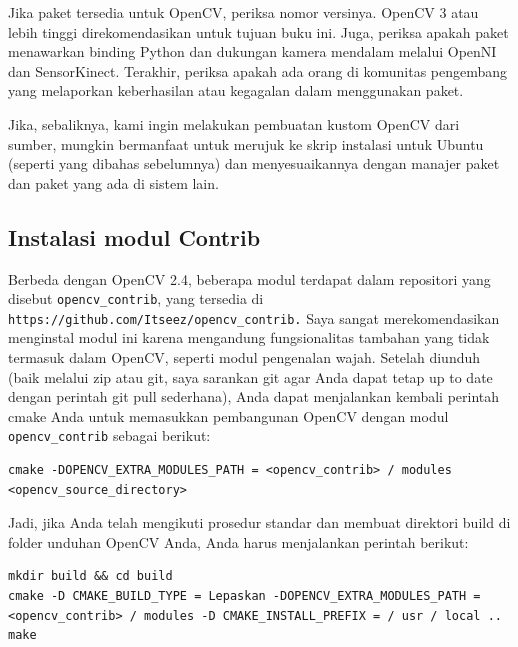 \begin{enumerate}
\begin{enumerate}
Jika paket tersedia untuk OpenCV, periksa nomor versinya. OpenCV 3 atau lebih tinggi direkomendasikan untuk tujuan buku ini. Juga, periksa apakah paket menawarkan binding Python dan dukungan kamera mendalam melalui OpenNI dan SensorKinect. Terakhir, periksa apakah ada orang di komunitas pengembang yang melaporkan keberhasilan atau kegagalan dalam menggunakan paket.

Jika, sebaliknya, kami ingin melakukan pembuatan kustom OpenCV dari sumber, mungkin bermanfaat untuk merujuk ke skrip instalasi untuk Ubuntu (seperti yang dibahas sebelumnya) dan menyesuaikannya dengan manajer paket dan paket yang ada di sistem lain.


\newpage
\subsection {Instalasi modul Contrib}
Berbeda dengan OpenCV 2.4, beberapa modul terdapat dalam repositori yang disebut \verb|opencv_contrib|, yang tersedia di \verb|https://github.com/Itseez/opencv_contrib.| Saya sangat merekomendasikan menginstal modul ini karena mengandung fungsionalitas tambahan yang tidak termasuk dalam OpenCV, seperti modul pengenalan wajah.
Setelah diunduh (baik melalui zip atau git, saya sarankan git agar Anda dapat tetap up to date dengan perintah git pull sederhana), Anda dapat menjalankan kembali perintah cmake Anda untuk memasukkan pembangunan OpenCV dengan modul \verb|opencv_contrib| sebagai berikut:
\begin{verbatim}
cmake -DOPENCV_EXTRA_MODULES_PATH = <opencv_contrib> / modules
<opencv_source_directory>
\end{verbatim}

Jadi, jika Anda telah mengikuti prosedur standar dan membuat direktori build di folder unduhan OpenCV Anda, Anda harus menjalankan perintah berikut:

\begin{verbatim}
mkdir build && cd build
cmake -D CMAKE_BUILD_TYPE = Lepaskan -DOPENCV_EXTRA_MODULES_PATH =
<opencv_contrib> / modules -D CMAKE_INSTALL_PREFIX = / usr / local ..
make
\end{verbatim}

\newpage

\end{enumerate}
\end{enumerate}

